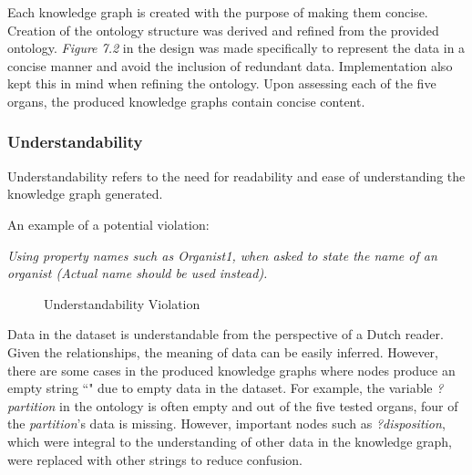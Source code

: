 Each knowledge graph is created with the purpose of making them concise. Creation of the ontology structure was derived and refined from the provided ontology. \textit{Figure 7.2} in the design was made specifically to represent the data in a concise manner and avoid the inclusion of redundant data. Implementation also kept this in mind when refining the ontology. Upon assessing each of the five organs, the produced knowledge graphs contain concise content.

\subsubsection{Understandability}
\hspace{0.5cm} Understandability refers to the need for readability and ease of understanding the knowledge graph generated. \cite{knowledgegraphevaulationbook}

\noindent An example of a potential violation: 
\vspace{-0.1cm}
\begin{displayquote}
    \textit{Using property names such as Organist1, when asked to state the name of an organist (Actual name should be used instead).}
\end{displayquote}

\begin{figure}[H]
\begin{center}
\end{center}
\vspace{-0.5cm}
\caption{Understandability Violation}
\end{figure}

Data in the dataset is understandable from the perspective of a Dutch reader. Given the relationships, the meaning of data can be easily inferred. However, there are some cases in the produced knowledge graphs where nodes produce an empty string ``" due to empty data in the dataset. For example, the variable \textit{?partition} in the ontology is often empty and out of the five tested organs, four of the \textit{partition}'s data is missing. However, important nodes such as \textit{?disposition}, which were integral to the understanding of other data in the knowledge graph, were replaced with other strings to reduce confusion. 

